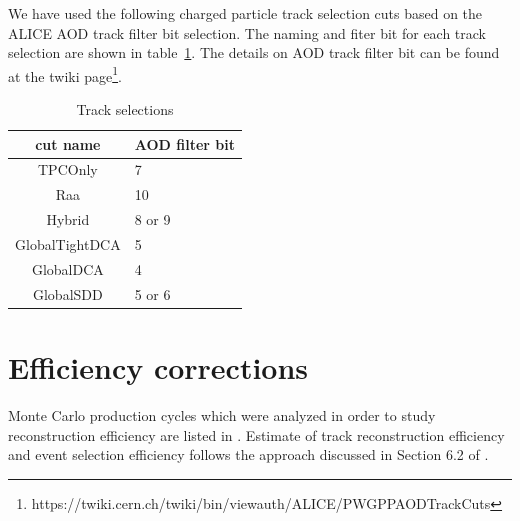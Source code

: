 \documentclass[ALICE,manyauthors]{ALICE_internal_notes}
\begin{document}
We have used the following charged particle track selection cuts based on the ALICE AOD track filter bit selection.
The naming and fiter bit for each track selection are shown in table~\ref{tab:treackfilterbit}.
The details on AOD track filter bit can be found at the twiki page\footnote{https://twiki.cern.ch/twiki/bin/viewauth/ALICE/PWGPPAODTrackCuts}.
\label{sec:tracks}
\begin{table}[ht]
\caption{Track selections} 
\begin{center}
\begin{tabular}{c|l}
\hline
cut name    &   AOD filter bit \\
\hline
TPCOnly    & 7 \\
Raa		  & 10 \\
Hybrid        & 8 or 9 \\
GlobalTightDCA & 5 \\
GlobalDCA         & 4 \\
GlobalSDD         & 5 or 6 \\
\hline
\end{tabular}
\end{center}
\label{tab:treackfilterbit}
\end{table}    


\newpage


\section{Efficiency corrections}
\label{sec:eff}
\label{sec:efficiency}
 Monte Carlo production cycles which were analyzed in order to study reconstruction efficiency
are listed in . Estimate of track reconstruction efficiency and event selection efficiency 
follows the approach discussed in Section 6.2 of \cite{JFthesis}.
\end{document}
